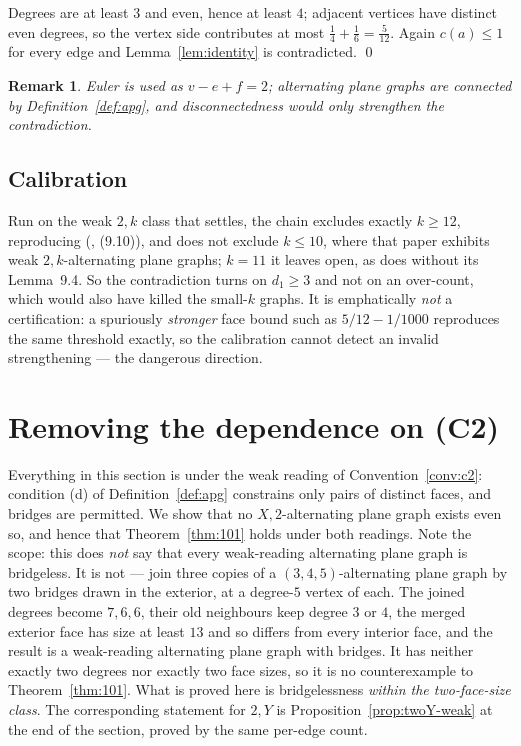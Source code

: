 \documentclass{baustms}
\theoremstyle{cupthm}
\theoremstyle{cupdefn}
\theoremstyle{cuprem}
\newtheorem{remark}[theorem]{Remark}
\begin{document}
Degrees are at least $3$ and even, hence at least $4$; adjacent vertices have
distinct even degrees, so the vertex side contributes at most
$\tfrac14+\tfrac16 = \tfrac{5}{12}$. Again $c(a) \le 1$ for every edge and
Lemma~\ref{lem:identity} is contradicted. \qed

\begin{remark}
Euler is used as $v - e + f = 2$; alternating plane graphs are connected by
Definition~\ref{def:apg}, and disconnectedness would only strengthen the
contradiction.
\end{remark}

\subsection{Calibration}

Run on the weak $2,k$ class that \cite{AHSSV2015} settles, the chain excludes
exactly $k \ge 12$, reproducing (\cite{AHSSV2015}, (9.10)), and does not exclude
$k \le 10$, where that paper exhibits weak $2,k$-alternating plane graphs; $k =
11$ it leaves open, as does \cite{AHSSV2015} without its Lemma~9.4. So the
contradiction turns on $d_1 \ge 3$ and not on an over-count, which would also
have killed the small-$k$ graphs. It is emphatically \emph{not} a
certification: a spuriously \emph{stronger} face bound such as $5/12 - 1/1000$
reproduces the same threshold exactly, so the calibration cannot detect an
invalid strengthening --- the dangerous direction.

\section{Removing the dependence on (C2)}\label{sec:c2}

Everything in this section is under the weak reading of
Convention~\ref{conv:c2}: condition (d) of Definition~\ref{def:apg} constrains
only pairs of distinct faces, and bridges are permitted. We show that no
$X,2$-alternating plane graph exists even so, and hence that
Theorem~\ref{thm:101} holds under both readings. Note the scope: this does
\emph{not} say that every weak-reading alternating plane graph is bridgeless.
It is not --- join three copies of a $(3,4,5)$-alternating plane graph by two
bridges drawn in the exterior, at a degree-$5$ vertex of each. The joined
degrees become $7,6,6$, their old neighbours keep degree $3$ or $4$, the merged
exterior face has size at least $13$ and so differs from every interior face,
and the result is a weak-reading alternating plane graph with bridges. It has
neither exactly two degrees nor exactly two face sizes, so it is no
counterexample to Theorem~\ref{thm:101}. What is proved here is bridgelessness
\emph{within the two-face-size class}. The corresponding statement for $2,Y$ is
Proposition~\ref{prop:twoY-weak} at the end of the section, proved by the same
per-edge count.
\end{document}
